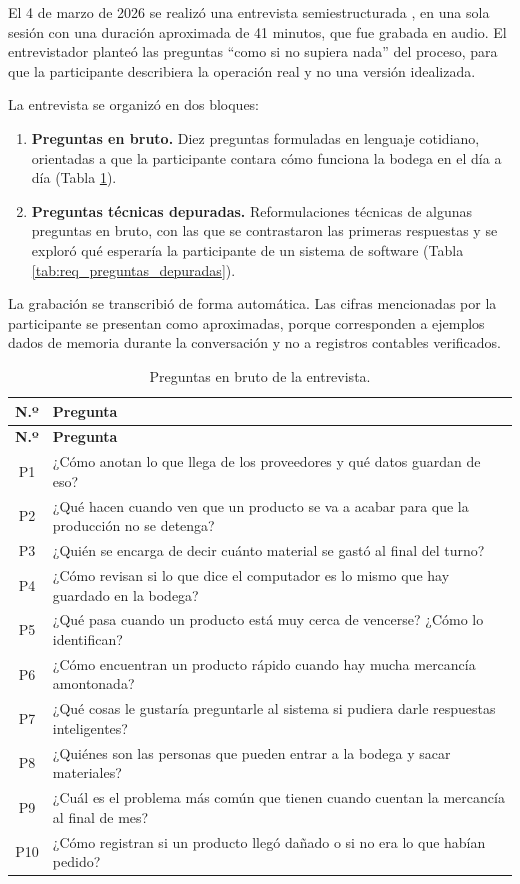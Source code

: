 El 4 de marzo de 2026 se realizó una entrevista semiestructurada \cite{pressman2014software, denzin_creswell}, en una sola sesión con una duración aproximada de 41 minutos, que fue grabada en audio. El entrevistador planteó las preguntas ``como si no supiera nada'' del proceso, para que la participante describiera la operación real y no una versión idealizada.

La entrevista se organizó en dos bloques:

\begin{enumerate}
    \item \textbf{Preguntas en bruto.} Diez preguntas formuladas en lenguaje cotidiano, orientadas a que la participante contara cómo funciona la bodega en el día a día (Tabla \ref{tab:req_preguntas_bruto}).
    \item \textbf{Preguntas técnicas depuradas.} Reformulaciones técnicas de algunas preguntas en bruto, con las que se contrastaron las primeras respuestas y se exploró qué esperaría la participante de un sistema de software (Tabla \ref{tab:req_preguntas_depuradas}).
\end{enumerate}

La grabación se transcribió de forma automática. Las cifras mencionadas por la participante se presentan como aproximadas, porque corresponden a ejemplos dados de memoria durante la conversación y no a registros contables verificados.

\begin{longtable}{|c|p{12cm}|}
\caption{Preguntas en bruto de la entrevista.}
\label{tab:req_preguntas_bruto}\\
\hline
\textbf{N.º} & \textbf{Pregunta} \\
\hline
\endfirsthead
\hline
\textbf{N.º} & \textbf{Pregunta} \\
\hline
\endhead
P1 & ¿Cómo anotan lo que llega de los proveedores y qué datos guardan de eso? \\ \hline
P2 & ¿Qué hacen cuando ven que un producto se va a acabar para que la producción no se detenga? \\ \hline
P3 & ¿Quién se encarga de decir cuánto material se gastó al final del turno? \\ \hline
P4 & ¿Cómo revisan si lo que dice el computador es lo mismo que hay guardado en la bodega? \\ \hline
P5 & ¿Qué pasa cuando un producto está muy cerca de vencerse? ¿Cómo lo identifican? \\ \hline
P6 & ¿Cómo encuentran un producto rápido cuando hay mucha mercancía amontonada? \\ \hline
P7 & ¿Qué cosas le gustaría preguntarle al sistema si pudiera darle respuestas inteligentes? \\ \hline
P8 & ¿Quiénes son las personas que pueden entrar a la bodega y sacar materiales? \\ \hline
P9 & ¿Cuál es el problema más común que tienen cuando cuentan la mercancía al final de mes? \\ \hline
P10 & ¿Cómo registran si un producto llegó dañado o si no era lo que habían pedido? \\ \hline
\end{longtable}

